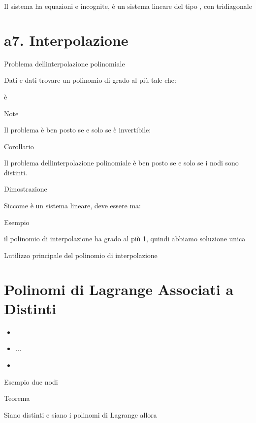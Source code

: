 \documentclass[
]{article}
\providecommand{\tightlist}{%
  \setlength{\itemsep}{0pt}\setlength{\parskip}{0pt}}
\begin{document}
Il sistema ha {} equazioni e {} incognite, è un sistema lineare del tipo
{}, con {} tridiagonale

\hypertarget{a7.-interpolazione}{%
\section{a7. Interpolazione}\label{a7.-interpolazione}}

Problema dell\textquotesingle interpolazione polinomiale

Dati {} e dati {} trovare un polinomio {} di grado al più {} tale che:\\
{}

è

Note

Il problema è ben posto se e solo se {} è invertibile:\\
{}

Corollario

Il problema dell\textquotesingle interpolazione polinomiale è ben posto
se e solo se i nodi sono distinti.

Dimostrazione

Siccome è un sistema lineare, deve essere {} ma:

Esempio

{} il polinomio di interpolazione ha grado al più 1, quindi abbiamo
soluzione unica

{}

L\textquotesingle utilizzo principale del polinomio di interpolazione

\hypertarget{polinomi-di-lagrange-associati-a-distinti}{%
\section{\texorpdfstring{Polinomi di Lagrange Associati a {}
Distinti}{Polinomi di Lagrange Associati a  Distinti}}\label{polinomi-di-lagrange-associati-a-distinti}}

\begin{itemize}
\tightlist
\item
  {}
\item
  ...
\item
  {}
\end{itemize}

{}

Esempio due nodi

{}

{}

Teorema

Siano {} distinti e siano {} i polinomi di Lagrange allora
\end{document}
